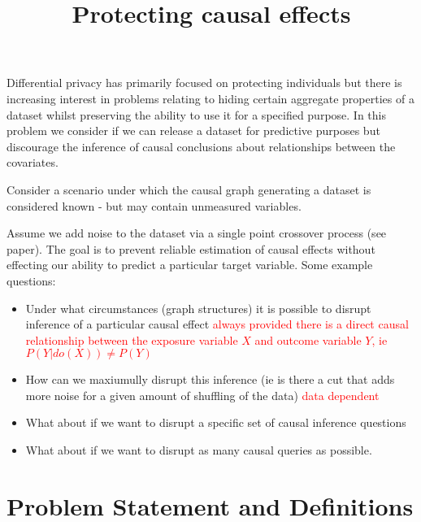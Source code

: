 \documentclass{article}
\title{Protecting causal effects}
\author{}
\theoremstyle{plain}
\theoremstyle{definition}
\begin{document}
\def\ci{\perp\!\!\!\perp}
\maketitle

Differential privacy has primarily focused on protecting individuals but there is increasing interest in problems relating to hiding certain aggregate properties of a dataset whilst preserving the ability to use it for a specified purpose. In this problem we consider if we can release a dataset for predictive purposes but discourage the inference of causal conclusions about relationships between the covariates. 

Consider a scenario under which the causal graph generating a dataset is considered known - but may contain unmeasured variables. 

Assume we add noise to the dataset via a single point crossover process (see paper). The goal is to prevent reliable estimation of causal effects without effecting our ability to predict a particular target variable. Some example questions:

\begin{itemize}
\item Under what circumstances (graph structures) it is possible to disrupt inference of a particular causal effect \textcolor{red}{always provided there is a direct causal relationship between the exposure variable $X$ and outcome variable $Y$, ie $P(Y|do(X))\neq P(Y)$} 
\item How can we maxiumully disrupt this inference (ie is there a cut that adds more noise for a given amount of shuffling of the data) \textcolor{red}{data dependent}
\item What about if we want to disrupt a specific set of causal inference questions
\item What about if we want to disrupt as many causal queries as possible.
\end{itemize}

\section{Problem Statement and Definitions}
\end{document}
